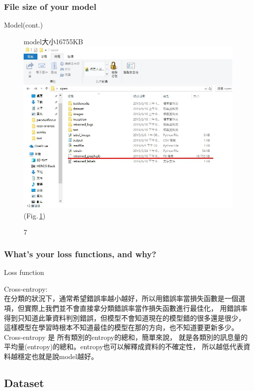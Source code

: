 \documentclass{beamer}
\begin{document}
\subsubsection{File size of your model }
\begin{frame}{Model(cont.)}
 \begin{figure}
 \begin{CJK}{UTF8}{bkai}
   model大小16755KB   \includegraphics[width=0.65\linewidth]{pbfile.jpg}(Fig.\,\ref{fig:7})
  \end{CJK}
      \caption{7}
      \label{fig:7}
    \end{figure}
\end{frame}

\subsubsection{What's your loss functions, and why? \bigskip \bigskip \bigskip  \bigskip  \bigskip   }
\begin{frame}{Loss function}
  \begin{CJK}{UTF8}{bkai}
	Cross-entropy:\\
	在分類的狀況下，通常希望錯誤率越小越好，所以用錯誤率當損失函數是一個選項，但實際上我們並不會直接拿分類錯誤率當作損失函數進行最佳化，
	用錯誤率得到只知道此筆資料判別錯誤，但模型不會知道現在的模型錯的很多還是很少，
	這樣模型在學習時根本不知道最佳的模型在那的方向，也不知道要更新多少。
	\\
	Cross-entropy 是 所有類別的entropy的總和，簡單來說，
	就是各類別的訊息量的平均量(entropy)的總和。entropy也可以解釋成資料的不確定性，
	所以越低代表資料越穩定也就是說model越好。
   \end{CJK}
\end{frame}





\subsection{Dataset}
\end{document}
